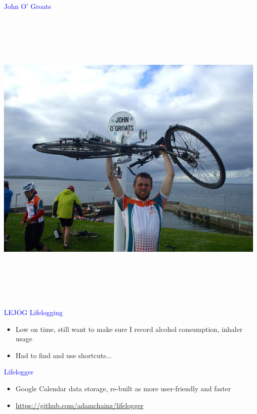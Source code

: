 \documentclass[landscape]{slides}
\begin{document}
\begin{slide}

    \textcolor{blue}{\Large{John O' Groats}}

    \begin{center}
        \includegraphics[height=15cm]{lejog-complete}
    \end{center}

\end{slide}


\begin{slide}

    \textcolor{blue}{\Large{LEJOG Lifelogging}}

    \begin{itemize}
        \item Low on time, still want to make sure I record alcohol consumption, inhaler usage
        \item Had to find and use shortcuts...
    \end{itemize}

\end{slide}




\begin{slide}

    \textcolor{blue}{\Large{Lifelogger}}

    \begin{itemize}
        \item Google Calendar data storage, re-built as more user-friendly and faster
        \item \url{https://github.com/adamchainz/lifelogger}
    \end{itemize}

\end{slide}
\end{document}
